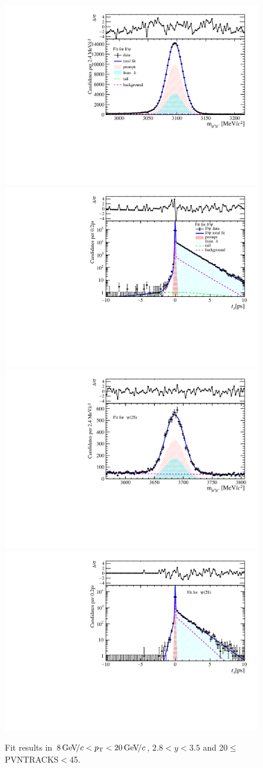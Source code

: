 \begin{figure}[H]
\begin{center}
\includegraphics[width=0.47\linewidth]{pdf/Jpsi/drawmass/n2y2pt5.pdf}
\includegraphics[width=0.47\linewidth]{pdf/Jpsi/2DFit/n2y2pt5.pdf}
\vspace*{-0.5cm}
\includegraphics[width=0.47\linewidth]{pdf/Psi2S/drawmass/n2y2pt5.pdf}
\includegraphics[width=0.47\linewidth]{pdf/Psi2S/2DFit/n2y2pt5.pdf}
\vspace*{-0.5cm}
\end{center}
\caption{Fit results in $8\text{\,Ge\kern -0.1em V\!/}c<p_{\mathrm{T}}<20\text{\,Ge\kern -0.1em V\!/}c$, $2.8<y<3.5$ and 20$\leq$PVNTRACKS$<$45.}
\label{Fitn2y2pt5}
\end{figure}

